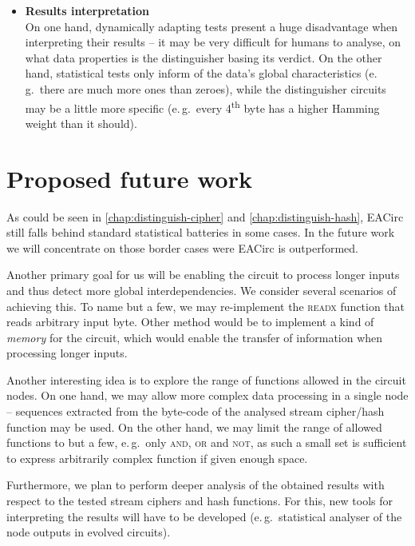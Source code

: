 \documentclass[12pt,twoside]{fithesis2}		%
\renewcommand{\_}{\leavevmode \kern0.0em\vbox{\hrule width0.4em}}
\newcommand{\squarebullet}{\textcolor{black}{\raisebox{0.15em}{\rule{4pt}{4pt}}}}
\newenvironment{myItemize}{
  \begin{itemize}[leftmargin=2em,rightmargin=1em,itemsep=\parskip ,parsep=0em,topsep=0em,partopsep=0em]
  \renewcommand{\labelitemi}{\squarebullet}
  \renewcommand{\labelitemii}{$\diamond$}
}{
  \end{itemize}
}
\begin{document}
\begin{myItemize}
by EACirc dynamically adapt to the data stream. Thus, if a data stream changes its properties, the test will evolve accordingly
(predefined statistical tests never change).
\item \textbf{Results interpretation}\\
On one hand, dynamically adapting tests present a huge disadvantage when interpreting their results -- it may be very difficult for
humans to analyse, on what data properties is the distinguisher basing its verdict. 
On the other hand, statistical tests only inform of the data's global
characteristics (e.\,g.\ there are much more ones than zeroes), while the distinguisher circuits may be a little more specific 
(e.\,g.\ every 4\textsuperscript{th} byte has a higher Hamming weight than it should).
\end{myItemize}

\section{Proposed future work}
\label{sec:outro-future-work}

As could be seen in \autoref{chap:distinguish-cipher} and \autoref{chap:distinguish-hash}, EACirc still falls behind standard 
statistical batteries in some cases. In the future work we will concentrate on those border cases were EACirc is outperformed.

Another primary goal for us will be enabling the circuit to process longer inputs and thus detect more global interdependencies.
We consider several scenarios of achieving this. To name but a few, we may re-implement the \textsc{readx} function that
reads arbitrary input byte. Other method would be to implement a kind of \textit{memory} for the circuit, which would enable
the transfer of information when processing longer inputs.

Another interesting idea is to explore the range of functions allowed in the circuit nodes. On one hand, we may allow more complex
data processing in a single node -- sequences extracted from the byte-code of the analysed stream cipher/hash function may be used.
On the other hand, we may limit the range of allowed functions to but a few, e.\,g.\ only \textsc{and}, \textsc{or} and \textsc{not},
as such a small set is sufficient to express arbitrarily complex function if given enough space.

Furthermore, we plan to perform deeper analysis of the obtained results with respect to the tested stream ciphers and hash functions.
For this, new tools for interpreting the results will have to be developed 
(e.\,g.\ statistical analyser of the node outputs in evolved circuits).
\end{document}
